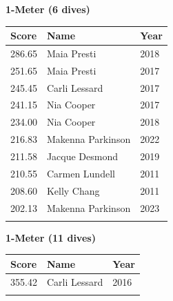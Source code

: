 \vspace{1.2em}
\noindent\begin{minipage}[t]{0.48\textwidth}
\centering
\textbf{\textcolor{teamprimary}{1-Meter (6 dives)}}\par
\vspace{0.5em}
\centering
\small
\renewcommand{\arraystretch}{1.0}
\setlength{\tabcolsep}{4pt}
\begin{tabular}{@{}p{1.8cm}p{3.0cm}p{1.0cm}@{}}
\toprule
\textbf{Score} & \textbf{Name} & \textbf{Year} \\
\midrule
286.65 & Maia Presti & 2018 \\
251.65 & Maia Presti & 2017 \\
245.45 & Carli Lessard & 2017 \\
241.15 & Nia Cooper & 2017 \\
234.00 & Nia Cooper & 2018 \\
216.83 & Makenna Parkinson & 2022 \\
211.58 & Jacque Desmond & 2019 \\
210.55 & Carmen Lundell & 2011 \\
208.60 & Kelly Chang & 2011 \\
202.13 & Makenna Parkinson & 2023 \\
\bottomrule
\vspace{0.5em}
\end{tabular}
\end{minipage}
\hfill
\begin{minipage}[t]{0.48\textwidth}
\centering
\textbf{\textcolor{teamprimary}{1-Meter (11 dives)}}\par
\vspace{0.5em}
\centering
\small
\renewcommand{\arraystretch}{1.0}
\setlength{\tabcolsep}{4pt}
\begin{tabular}{@{}p{1.8cm}p{3.0cm}p{1.0cm}@{}}
\toprule
\textbf{Score} & \textbf{Name} & \textbf{Year} \\
\midrule
355.42 & Carli Lessard & 2016 \\
\bottomrule
\vspace{0.5em}
\end{tabular}
\end{minipage}
\vspace{1.2em}
